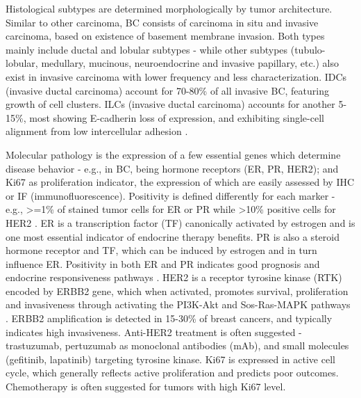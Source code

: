 Histological subtypes are determined morphologically by tumor architecture. Similar to other carcinoma, BC consists of carcinoma in situ and invasive carcinoma, based on existence of basement membrane invasion. Both types mainly include ductal and lobular subtypes - while other subtypes (tubulo-lobular, medullary, mucinous, neuroendocrine and invasive papillary, etc.) also exist in invasive carcinoma with lower frequency and less characterization. IDCs (invasive ductal carcinoma) account for 70-80\% of all invasive BC, featuring growth of cell clusters. ILCs (invasive ductal carcinoma) accounts for another 5-15\%, most showing E-cadherin loss of expression, and exhibiting single-cell alignment from low intercellular adhesion \citep{american2019breast}. 

Molecular pathology is the expression of a few essential genes which determine disease behavior - e.g., in BC, being hormone receptors (ER, PR, HER2); and Ki67 as proliferation indicator, the expression of which are easily assessed by IHC or IF (immunofluorescence). Positivity is defined differently for each marker - e.g., >=1\% of stained tumor cells for ER or PR while >10\% positive cells for HER2 \citep{fragomeni2018molecular}. ER is a transcription factor (TF) canonically activated by estrogen and is one most essential indicator of endocrine therapy benefits. PR is also a steroid hormone receptor and TF, which can be induced by estrogen and in turn influence ER. Positivity in both ER and PR indicates good prognosis and endocrine responsiveness pathways \citep{lange2008challenges}. HER2 is a receptor tyrosine kinase (RTK) encoded by ERBB2 gene, which when activated, promotes survival, proliferation and invasiveness through activating the PI3K-Akt and Sos-Ras-MAPK pathways \citep{hudis2007trastuzumab}. ERBB2 amplification is detected in 15-30\% of breast cancers, and typically indicates high invasiveness. Anti-HER2 treatment is often suggested - trastuzumab, pertuzumab as monoclonal antibodies (mAb), and small molecules (gefitinib, lapatinib) targeting tyrosine kinase. Ki67 is expressed in active cell cycle, which generally reflects active proliferation and predicts poor outcomes. Chemotherapy is often suggested for tumors with high Ki67 level.

